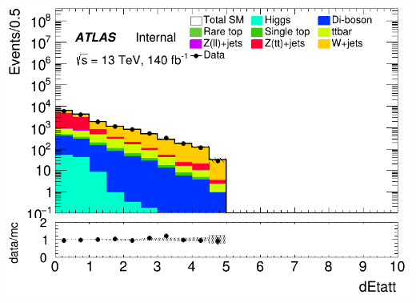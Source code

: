 \documentclass[usenames,dvipsnames]{beamer}
\begin{document}
\begin{frame}
\begin{minipage}{0.32\textwidth}
        \centering
        \includegraphics[width=\textwidth]{graphics/HH_met/HH_met_dEtatt.png}
    \end{minipage}
    
    \vspace{0.5cm} %
\end{frame}
\end{document}

